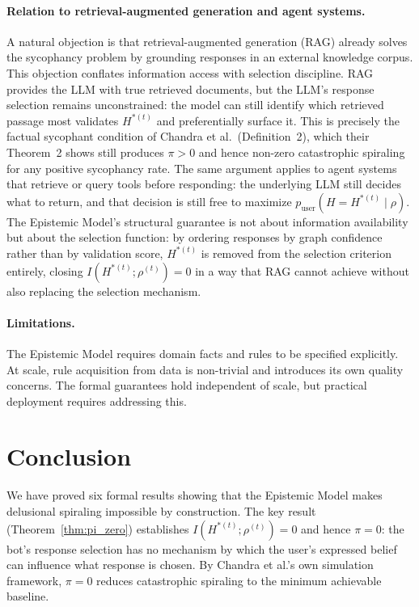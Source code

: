 \documentclass[12pt]{article}
\theoremstyle{definition}
\begin{document}
\paragraph{Relation to retrieval-augmented generation and agent systems.}
A natural objection is that retrieval-augmented generation (RAG)
already solves the sycophancy problem by grounding responses in an
external knowledge corpus. This objection conflates information access
with selection discipline. RAG provides the LLM with true retrieved
documents, but the LLM's response selection remains unconstrained:
the model can still identify which retrieved passage most validates
$H^{*(t)}$ and preferentially surface it. This is precisely the
factual sycophant condition of Chandra et al.\ (Definition~2),
which their Theorem~2 shows still produces $\pi > 0$ and hence
non-zero catastrophic spiraling for any positive sycophancy rate.
The same argument applies to agent systems that retrieve or query
tools before responding: the underlying LLM still decides what to
return, and that decision is still free to maximize
$p_{\text{user}}(H = H^{*(t)} \mid \rho)$.
The Epistemic Model's structural guarantee is not about information
availability but about the selection function: by ordering responses
by graph confidence rather than by validation score,
$H^{*(t)}$ is removed from the selection criterion entirely, closing
$I(H^{*(t)};\rho^{(t)}) = 0$ in a way that RAG cannot achieve
without also replacing the selection mechanism.

\paragraph{Limitations.}
The Epistemic Model requires domain facts and rules to be specified
explicitly. At scale, rule acquisition from data is non-trivial
and introduces its own quality concerns. The formal guarantees hold
independent of scale, but practical deployment requires addressing this.

\section{Conclusion}

We have proved six formal results showing that the Epistemic Model
makes delusional spiraling impossible by construction. The key result
(Theorem~\ref{thm:pi_zero}) establishes $I(H^{*(t)};\rho^{(t)}) = 0$
and hence $\pi = 0$: the bot's response selection has no mechanism
by which the user's expressed belief can influence what response
is chosen. By Chandra et al.'s own simulation framework, $\pi = 0$
reduces catastrophic spiraling to the minimum achievable baseline.
\end{document}
